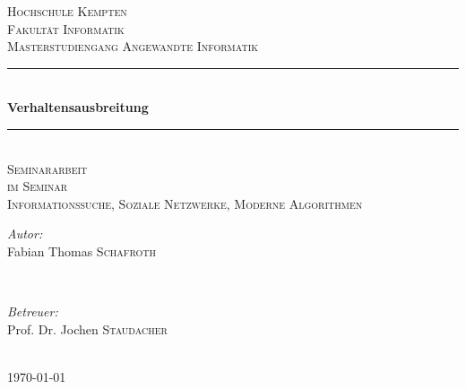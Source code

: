 \documentclass[12pt]{article}
\begin{document}
\begin{titlepage}
\newcommand{\HRule}{\rule{\linewidth}{0.5mm}}
\center

\textsc{\LARGE Hochschule Kempten}\\[0.5cm]
\textsc{\large Fakultät Informatik}\\[0.5cm]
\textsc{\large Masterstudiengang Angewandte Informatik}\\[1.5cm]

\HRule \\[0.4cm]
{\huge \bfseries Verhaltensausbreitung}\\[0.2cm]
\HRule \\[1.0cm]

\textsc{\LARGE Seminararbeit}\\[0.5cm]
\textsc{\large im Seminar}\\[0.5cm]
\textsc{\LARGE Informationssuche, Soziale Netzwerke, Moderne Algorithmen}\\[1.5cm]



\begin{minipage}{0.4\textwidth}
\begin{flushleft}\large
\emph{Autor:}\\
Fabian Thomas \textsc{Schafroth}
\end{flushleft}
\end{minipage}
~
\begin{minipage}{0.4\textwidth}
\begin{flushright}\large
\emph{Betreuer:}\\
Prof. Dr. Jochen \textsc{Staudacher}
\end{flushright}
\end{minipage}\\[4cm]
{\large \today}\\[3cm]


\vfill
\end{titlepage}
\newpage
	\tableofcontents
\newpage
{}
\end{document}
